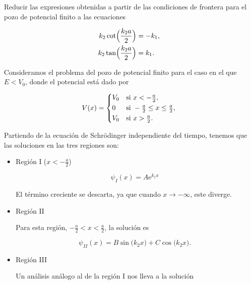 \documentclass[../main.tex]{subfiles}
\begin{document}
\begin{problema}
	Reducir las expresiones obtenidas a partir de las condiciones de frontera para el pozo de potencial finito a las ecuaciones

	\begin{align*}
		k_{2} \cot \Bigl(\dfrac{k_{2}a}{2}\Bigr) & = -k_{1}, \\
		k_{2}\tan \Bigl(\dfrac{k_{2}a}{2}\Bigr)  & = k_{1}.
	\end{align*}

	\startsolution

	Consideramos el problema del pozo de potencial finito para el caso
	en el que \(E < V_{0}\), donde el potencial está dado por

	\begin{equation*}
		V(x) =
		\begin{dcases}
			V_{0} & \text{si } x < -\tfrac{a}{2},                      \\
			0     & \text{si } -\tfrac{a}{2} \leq x \leq \tfrac{a}{2}, \\
			V_{0} & \text{si } x > \tfrac{a}{2}.
		\end{dcases}
	\end{equation*}

	Partiendo de la ecuación de Schrödinger independiente del tiempo, tenemos
	que las soluciones en las tres regiones son:

	\begin{itemize}
		\item Región I (\(x < -\tfrac{a}{2}\))

		      \begin{equation*}
			      \psi_{I}(x) = A \mathrm{e}^{k_{1} x}
		      \end{equation*}

		      El término creciente se descarta, ya que cuando \(x \to -\infty\), este
		      diverge.

		\item Región II

		      Para esta región, \(-\tfrac{a}{2} < x < \tfrac{a}{2}\), la solución es

		      \begin{equation*}
			      \psi_{II}(x) = B \sin\bigl(k_{2}x\bigr) + C\cos\bigl(k_{2}x\bigr).
		      \end{equation*}

		\item Región III

		      Un análisis análogo al de la región I nos lleva a la solución


\end{itemize}
\end{problema}
\end{document}
